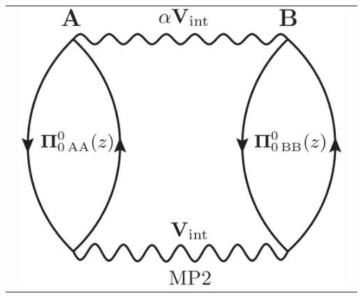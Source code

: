 \documentclass{standalone}
\begin{document}
\begin{tabular}{ccc}
  & \includegraphics[scale=0.14]{mp2.eps} 
\end{tabular}
\end{document}
